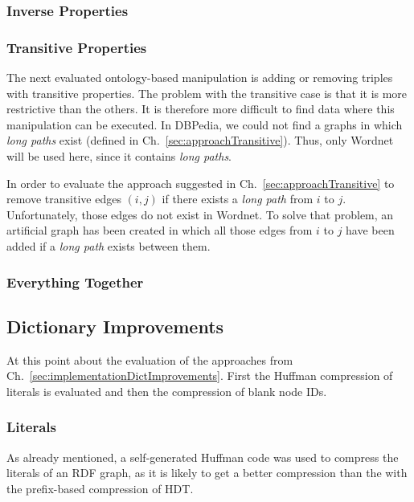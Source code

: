 \subsubsection{Inverse Properties}

\subsubsection{Transitive Properties}

The next evaluated ontology-based manipulation is adding or removing triples with transitive properties. The problem with the transitive case is that it is more restrictive than the others. It is therefore more difficult to find data where this manipulation can be executed. In DBPedia, we could not find a graphs in which \textit{long paths} exist (defined in Ch.~\ref{sec:approachTransitive}). Thus, only Wordnet will be used here, since it contains \textit{long paths}.

In order to evaluate the approach suggested in Ch.~\ref{sec:approachTransitive} to remove transitive edges $(i,j)$ if there exists a \textit{long path} from $i$ to $j$. Unfortunately, those edges do not exist in Wordnet. To solve that problem, an artificial graph has been created in which all those edges from $i$ to $j$ have been added if a \textit{long path} exists between them.

\subsubsection{Everything Together}

\subsection{Dictionary Improvements}\label{sec:evaluationDictImprovements}

At this point  about the evaluation of the approaches from Ch.~\ref{sec:implementationDictImprovements}. First the Huffman compression of literals is evaluated and then the compression of blank node IDs. 


\subsubsection{Literals}

As already mentioned, a self-generated Huffman code was used to compress the literals of an RDF graph, as it is likely to get a better compression than the with the prefix-based compression of HDT.

